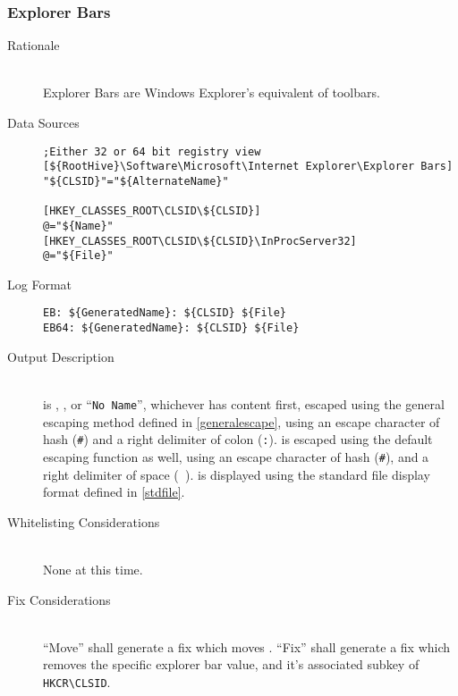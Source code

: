 \subsubsection{Explorer Bars}
\begin{description}
\item[Rationale] \hfill \\
Explorer Bars are Windows Explorer's equivalent of toolbars.
\item[Data Sources] \hfill
\vspace{-\baselineskip}
\begin{verbatim}
;Either 32 or 64 bit registry view
[${RootHive}\Software\Microsoft\Internet Explorer\Explorer Bars]
"${CLSID}"="${AlternateName}"

[HKEY_CLASSES_ROOT\CLSID\${CLSID}]
@="${Name}"
[HKEY_CLASSES_ROOT\CLSID\${CLSID}\InProcServer32]
@="${File}"
\end{verbatim}
\item[Log Format] \hfill
\vspace{-\baselineskip}
\begin{verbatim}
EB: ${GeneratedName}: ${CLSID} ${File}
EB64: ${GeneratedName}: ${CLSID} ${File}
\end{verbatim}
\item[Output Description] \hfill \\
 is , , or ``\verb|No Name|'',
whichever has content first, escaped using the general escaping method defined
in \ref{generalescape}, using an escape character of hash (\verb|#|) and a right
delimiter of colon (\verb|:|).  is escaped using the default escaping
function as well, using an escape character of hash (\verb|#|), and a right
delimiter of space (\verb| |).  is displayed using the standard file
display format defined in \ref{stdfile}.
\item[Whitelisting Considerations] \hfill \\
None at this time.
\item[Fix Considerations] \hfill \\
``Move'' shall generate a fix which moves . ``Fix'' shall generate a
fix which removes the specific explorer bar value, and it's associated subkey of
\verb|HKCR\CLSID|.
\end{description}

